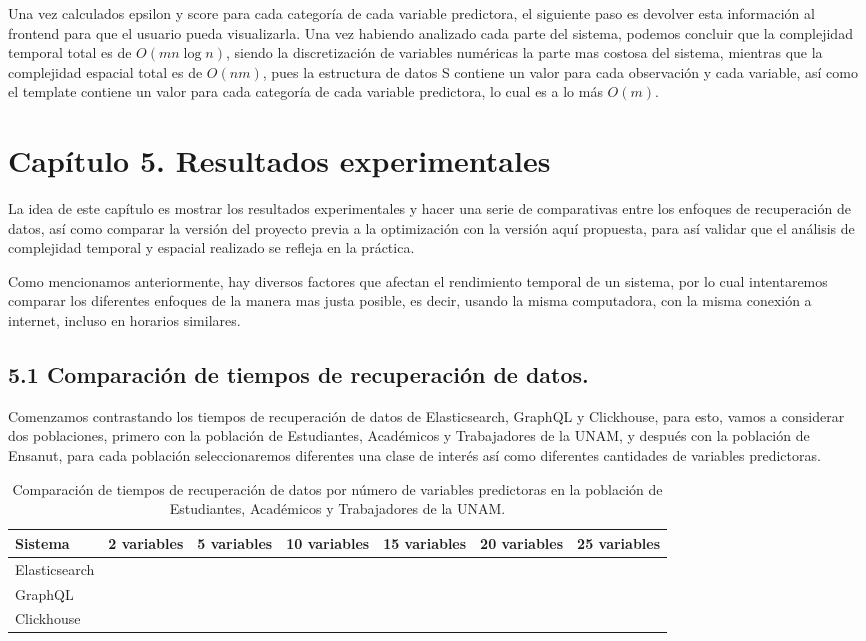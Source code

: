 \documentclass[
 12pt,
 letterpaper,
]{article}
\theoremstyle{teoremaBreak}
\theoremstyle{plain}
\theoremstyle{definition}
\begin{document}
Una vez calculados epsilon y score para cada categoría de cada variable predictora, el siguiente paso es 
devolver esta información al frontend para que el usuario pueda visualizarla.
Una vez habiendo analizado cada parte del sistema, podemos concluir que la complejidad temporal total es de $O(m n \log n)$, 
siendo la discretización de variables numéricas la parte mas costosa del sistema, mientras que la complejidad espacial total es de 
$O(nm)$, pues la estructura de datos S contiene un valor para cada observación y cada variable, así como el template contiene 
un valor para cada categoría de cada variable predictora, lo cual es a lo más $O(m)$.


\section{Capítulo 5. Resultados experimentales}\label{capuxedtulo-5.-resultados-experimentales.}

La idea de este capítulo es mostrar los resultados experimentales y hacer una serie de comparativas entre los enfoques de recuperación 
de datos, así como comparar la versión del proyecto previa a la optimización con la versión aquí propuesta, para así validar 
que el análisis de complejidad temporal y espacial realizado se refleja en la práctica.

Como mencionamos anteriormente, hay diversos factores que afectan el rendimiento temporal de un sistema, por lo cual intentaremos 
comparar los diferentes enfoques de la manera mas justa posible, es decir, usando la misma computadora, con la misma conexión a 
internet, incluso en horarios similares.

\subsection{5.1 Comparación de tiempos de recuperación de datos.}\label{5.1-comparación-de-tiempos-de-recuperación-de-datos.}

Comenzamos contrastando los tiempos de recuperación de datos de Elasticsearch, GraphQL y Clickhouse, para esto, vamos a 
considerar dos poblaciones, primero con la población de Estudiantes, Académicos y Trabajadores de la UNAM, y después con la población 
de Ensanut, para cada población seleccionaremos diferentes una clase de interés así como diferentes cantidades de variables 
predictoras. 

\begin{table}[htbp]
\centering
\caption{Comparación de tiempos de recuperación de datos por número de variables predictoras en la población 
de Estudiantes, Académicos y Trabajadores de la UNAM.}
\label{tab:comparacion-recuperacion-datos}
\begin{tabular}{|l|c|c|c|c|c|c|}
\hline
Sistema & 2 variables & 5 variables & 10 variables & 15 variables & 20 variables & 25 variables  \\
\hline
Elasticsearch &  &  &  &  &  &  \\
\hline
GraphQL &  &  &  &  &  &  \\
\hline
Clickhouse &  &  &  &  &  & \\
\hline
\end{tabular}
\end{table}
\end{document}
